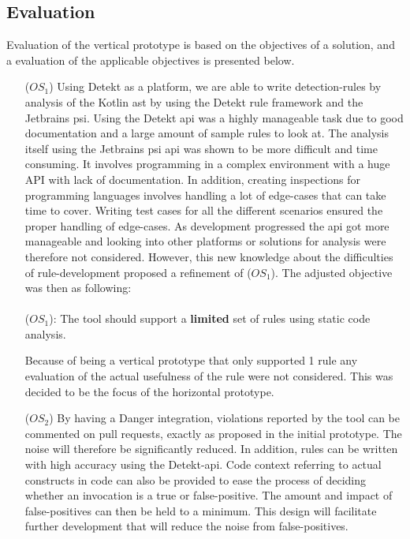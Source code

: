 \documentclass[pdftex,10pt,b5paper,twoside]{report}
\begin{document}
\subsection*{Evaluation}
Evaluation of the vertical prototype is based on the objectives of a solution, and a evaluation of the applicable objectives is presented below.
\begin{itemize}
    \item [(\(OS_{1}\))] Using Detekt as a platform, we are able to write detection-rules by analysis of the Kotlin \gls{ast} by using the Detekt rule framework and the Jetbrains \gls{psi}. Using the Detekt \gls{api} was a highly manageable task due to good documentation and a large amount of sample rules to look at. The analysis itself using the Jetbrains \gls{psi} \gls{api} was shown to be more difficult and time consuming. It involves programming in a complex environment with a huge API with lack of documentation. In addition, creating inspections for programming languages involves handling a lot of edge-cases that can take time to cover. Writing test cases for all the different scenarios ensured the proper handling of edge-cases. As development progressed the \gls{api} got more manageable and looking into other platforms or solutions for analysis were therefore not considered. However, this new knowledge about the difficulties of rule-development proposed a refinement of (\(OS_{1}\)). The adjusted objective was then as following: \\\\(\(OS_{1}\)): The tool should support a \textbf{limited} set of rules using static code analysis. \label{vertical-os1}
    
    Because of being a vertical prototype that only supported 1 rule any evaluation of the actual usefulness of the rule were not considered. This was decided to be the focus of the horizontal prototype.
    
    \item [(\(OS_{2}\))] By having a Danger integration, violations reported by the tool can be commented on pull requests, exactly as proposed in the initial prototype. The noise will therefore be significantly reduced. In addition, rules can be written with high accuracy using the Detekt-api. Code context referring to actual constructs in code can also be provided to ease the process of deciding whether an invocation is a true or false-positive. The amount and impact of false-positives can then be held to a minimum. This design will facilitate further development that will reduce the noise from false-positives. 
    

\end{itemize}
\end{document}
